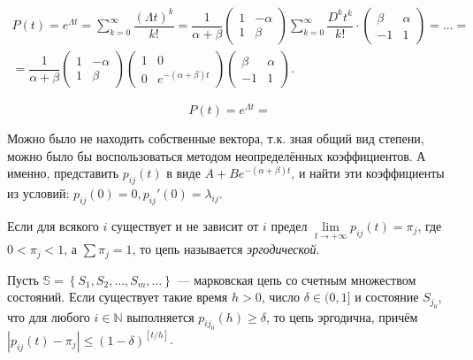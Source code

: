 \begin{ex}
  \begin{multline*}
    P(t) = e^{\Lambda t} = \sum_{k=0}^\infty \dfrac{(\Lambda t)^k}{k!}
    = \dfrac{1}{\alpha+\beta} \begin{pmatrix}
      1 & -\alpha \\
      1 & \beta
    \end{pmatrix}
    \sum_{k=0}^\infty \dfrac{D^k t^k}{k!} \cdot
    \begin{pmatrix}
      \beta & \alpha \\
      -1 & 1
    \end{pmatrix} = \ldots =\\= \dfrac{1}{\alpha+\beta} \begin{pmatrix}
      1 & -\alpha \\
      1 & \beta
    \end{pmatrix}
    \begin{pmatrix}
      1 & 0 \\
      0 & e^{-(\alpha+\beta) t}
    \end{pmatrix} \begin{pmatrix}
      \beta & \alpha \\
      -1 & 1
    \end{pmatrix}.
  \end{multline*}

  \[
    P(t) = e^{\Lambda t} = 
  \]

  Можно было не находить собственные вектора, т.к. зная общий вид
  степени, можно было бы воспользоваться методом неопределённых коэффициентов. А
  именно,
  представить $p_{ij}(t)$ в виде $A + B e^{-(\alpha+\beta) t}$, и найти 
  эти коэффициенты из условий: $p_{ij}(0) = 0, p_{ij}'(0) = \lambda_{ij}$.
\end{ex}

\begin{definition}
  Если для всякого $ i $ существует и не зависит от $ i $ предел
  $\lim\limits_{t\to +\infty} p_{ij}(t) = \pi_j$, где $ 0 < \pi_j < 1$, а $\sum \pi_j = 1$,
  то цепь называется \emph{эргодической}.
\end{definition}

\begin{theorem}[эргодическая]
  Пусть $\mathbb{S} = \left\{ S_1, S_2, \dots, S_m, \dots \right\} $ ---
  марковская цепь со счетным множеством состояний. Если существует такие время
  $ h > 0 $, число $ \delta \in (0, 1] $ и состояние $ S_{j_0} $, что для любого
  $ i \in \mathbb N $ выполняется $ p_{ij_0}(h) \geqslant \delta $,
  то цепь эргодична, причём $|p_{ij}(t) - \pi_j| \leqslant
  (1-\delta)^{\left[t/h\right]}$.
\end{theorem}

